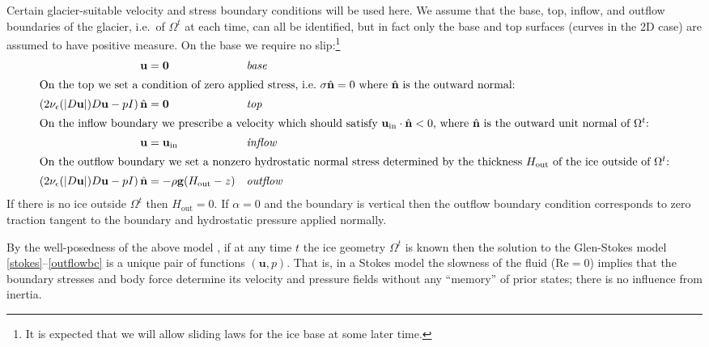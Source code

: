 \documentclass[letterpaper,final,12pt,reqno]{amsart}
\newcommand{\eps}{\epsilon}
\newcommand{\hbn}{\hat{\mathbf{n}}}
\newcommand{\bg}{\mathbf{g}}
\newcommand{\bu}{\mathbf{u}}
\newcommand{\bzero}{\bm{0}}
\begin{document}
Certain glacier-suitable velocity and stress boundary conditions will be used here.  We assume that the base, top, inflow, and outflow boundaries of the glacier, i.e.~of $\Omega^t$ at each time, can all be identified, but in fact only the base and top surfaces (curves in the 2D case) are assumed to have positive measure.   On the base we require no slip:\footnote{It is expected that we will allow sliding laws for the ice base  \cite{JouvetRappaz2011} at some later time.}
\begin{align}
\bu &= \bzero  &&\text{\emph{base}} \label{basebc} \\
\intertext{On the top we set a condition of zero applied stress, i.e.~$\sigma\hbn=0$ where $\hbn$ is the outward normal:}
\left(2 \nu_\eps(|D\bu|) D\bu - pI\right) \hbn &= \bzero  &&\text{\emph{top}} \label{topbc} \\
\intertext{On the inflow boundary we prescribe a velocity which should satisfy $\bu_{\text{in}}\cdot \hbn < 0$, where $\hbn$ is the outward unit normal of $\Omega^t$:}
\bu &= \bu_{\text{in}}  &&\text{\emph{inflow}} \label{inflowbc} \\
\intertext{On the outflow boundary we set a nonzero hydrostatic normal stress determined by the thickness $H_{\text{out}}$ of the ice outside of $\Omega^t$:}
\left(2 \nu_\eps(|D\bu|) D\bu - pI\right) \hbn &= -\rho \bg (H_{\text{out}}-z) &&\text{\emph{outflow}} \label{outflowbc}
\end{align}
If there is no ice outside $\Omega^t$ then $H_{\text{out}}=0$.  If $\alpha=0$ and the boundary is vertical then the outflow boundary condition corresponds to zero traction tangent to the boundary and hydrostatic pressure applied normally.

By the well-posedness of the above model \cite{JouvetRappaz2011}, if at any time $t$ the ice geometry $\Omega^t$ is known then the solution to the Glen-Stokes model \eqref{stokes}--\eqref{outflowbc} is a unique pair of functions $(\bu,p)$.  That is, in a Stokes model the slowness of the fluid ($\text{Re}=0$) implies that the boundary stresses and body force determine its velocity and pressure fields without any ``memory'' of prior states; there is no influence from inertia.
\end{document}
